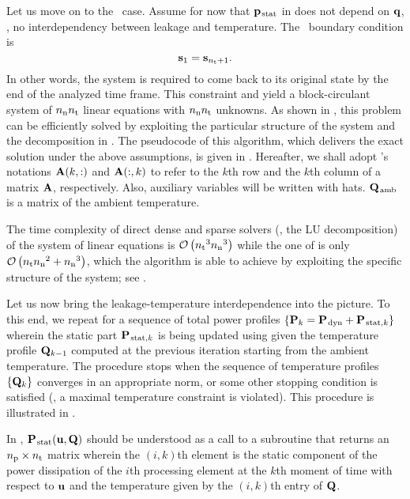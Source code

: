 Let us move on to the \DSS\ case.
Assume for now that $\mathbf{p}_{\text{\kern0.1emstat}}$ in  does not depend on $\mathbf{q}$, \ie, no interdependency between leakage and temperature.
The \DSS\ boundary condition is
\[
  \mathbf{s}_1 = \mathbf{s}_{{n_\text{t}} + 1}.
\]
In other words, the system is required to come back to its original state by the end of the analyzed time frame.
This constraint and  yield a block-circulant system of ${n_\text{n}} {n_\text{t}}$ linear equations with ${n_\text{n}} {n_\text{t}}$ unknowns.
As shown in \cite{ukhov2012}, this problem can be efficiently solved by exploiting the particular structure of the system and the decomposition in .
The pseudocode of this algorithm, which delivers the exact solution under the above assumptions, is given in .
Hereafter, we shall adopt 's \cite{matlab} notations $\mathbf{A}(k, :)$ and $\mathbf{A}(:, k)$ to refer to the $k$th row and the $k$th column of a matrix $\mathbf{A}$, respectively.
Also, auxiliary variables will be written with hats.
$\mathbf{Q}_{\text{\kern0.1emamb}}$ is a matrix of the ambient temperature.

\begin{remark}
The time complexity of  direct dense and sparse solvers (\eg, the LU decomposition) of the system of linear equations is $\mathcal{O}\left( {n_\text{t}}^3 {n_\text{n}}^3 \right)$ while the one of  is only $\mathcal{O}\left( {n_\text{t}} {n_\text{n}}^2 + {n_\text{n}}^3 \right)$, which the algorithm is able to achieve by exploiting the specific structure of the system; see \cite{ukhov2012}.
\end{remark}

Let us now bring the leakage-temperature interdependence into the picture.
To this end, we repeat  for a sequence of total power profiles $\{ \mathbf{P}_k = \mathbf{P}_{\text{\kern0.1emdyn}} + \mathbf{P}_{\text{\kern0.1emstat}, k} \}$ wherein the static part $\mathbf{P}_{\text{\kern0.1emstat}, k}$ is being updated using  given the temperature profile $\mathbf{Q}_{k - 1}$ computed at the previous iteration starting from the ambient temperature.
The procedure stops when the sequence of temperature profiles $\{ \mathbf{Q}_k \}$ converges in an appropriate norm, or some other stopping condition is satisfied (\eg, a maximal temperature constraint is violated).
This procedure is illustrated in .


In , $\mathbf{P}_{\text{\kern0.1emstat}}(\mathbf{u}, \mathbf{Q})$ should be understood as a call to a subroutine that returns an ${n_\text{p}} \times {n_\text{t}}$ matrix wherein the $(i, k)$th element is the static component of the power dissipation of the $i$th processing element at the $k$th moment of time with respect to $\mathbf{u}$ and the temperature given by the $(i, k)$th entry of $\mathbf{Q}$.

